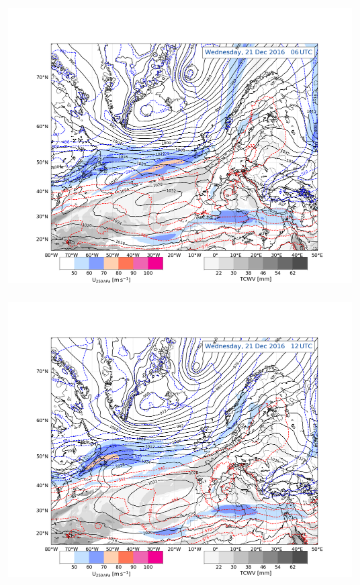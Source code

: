 \begin{figure}[!t]
	\begin{subfigure}[b]{0.49\textwidth}
		\includegraphics[trim={4.2cm 0cm 4.3cm 5.1cm},clip,
		width=\textwidth]{./fig_Geopot_Jet/20161221_06}
		\caption{} \label{fig:GP21_06}
	\end{subfigure}
	\begin{subfigure}[b]{0.49\textwidth}
		\includegraphics[trim={4.2cm 0cm 4.3cm 5.1cm},clip,
		width=\textwidth]{./fig_Geopot_Jet/20161221_12}
		\caption{} \label{fig:GP21}
	\end{subfigure}
	\begin{subfigure}[b]{0.49\textwidth}

\end{subfigure}
\end{figure}
